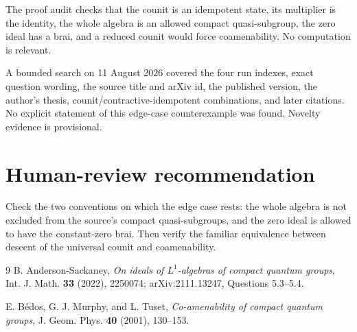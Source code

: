 \documentclass[11pt]{article}
\begin{document}
The proof audit checks that the counit is an idempotent state, its multiplier
is the identity, the whole algebra is an allowed compact quasi-subgroup, the
zero ideal has a brai, and a reduced counit would force coamenability. No
computation is relevant.

A bounded search on 11 August 2026 covered the four run indexes, exact
question wording, the source title and arXiv id, the published version, the
author's thesis, counit/contractive-idempotent combinations, and later
citations. No explicit statement of this edge-case counterexample was found.
Novelty evidence is provisional.

\section*{Human-review recommendation}

Check the two conventions on which the edge case rests: the whole algebra is
not excluded from the source's compact quasi-subgroups, and the zero ideal is
allowed to have the constant-zero brai. Then verify the familiar equivalence
between descent of the universal counit and coamenability.

\begin{thebibliography}{9}
B. Anderson-Sackaney,
\emph{On ideals of $L^1$-algebras of compact quantum groups},
Int. J. Math. \textbf{33} (2022), 2250074; arXiv:2111.13247,
Questions 5.3--5.4.

E. B\'edos, G. J. Murphy, and L. Tuset,
\emph{Co-amenability of compact quantum groups},
J. Geom. Phys. \textbf{40} (2001), 130--153.
\end{thebibliography}
\end{document}
